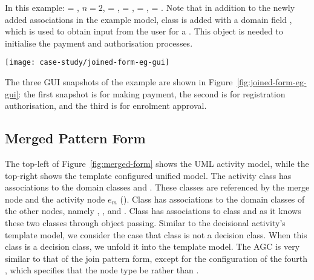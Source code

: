 In this example:  = , $ n = 2 $,  = ,  = ,  = ,  = .
Note that in addition to the newly added associations in the example model, class  is added with a domain field , which is used to obtain input from the user for a . This  object is needed to initialise the payment and authorisation processes.

\begin{figure*}[ht]
	\begin{center}
		\texttt{[image: case-study/joined-form-eg-gui]}
	\end{center}
	\caption{The joined pattern form view of enrolment management activity.} %
	\label{fig:joined-form-eg-gui}
\end{figure*}

The three GUI snapshots of the example are shown in Figure~\ref{fig:joined-form-eg-gui}: the first snapshot is for making payment, the second is for registration authorisation, and the third is for enrolment approval.

\subsection{Merged Pattern Form} \label{sect:merged-pattern}

The top-left of Figure~\ref{fig:merged-form} shows the UML activity model, while the top-right shows the template configured unified model. The activity class  has associations to the domain classes  and . These classes are referenced by the merge node and the activity node $ e_m $ (\resp). Class  has associations to the domain classes of the other nodes, namely , , and . Class  has associations to class  and  as it knows these two classes through object passing.
%
Similar to the decisional activity's template model, we consider the case that class  is not a decision class. When this class is a decision class, we unfold it into the template model.
%
The AGC is very similar to that of the join pattern form, except for the configuration of the fourth , which specifies that the node type be  rather than .

